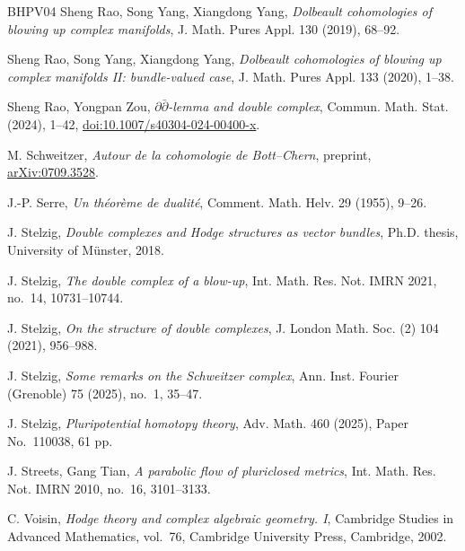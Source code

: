 \documentclass[11pt]{amsart}
\numberwithin{equation}{section}
\theoremstyle{plain}
\theoremstyle{definition}
\begin{document}
\begin{thebibliography}{BHPV04}
Sheng Rao, Song Yang, Xiangdong Yang,
\textit{Dolbeault cohomologies of blowing up complex manifolds},
J. Math. Pures Appl. 130 (2019), 68--92.

Sheng Rao, Song Yang, Xiangdong Yang,
\textit{Dolbeault cohomologies of blowing up complex manifolds II:
bundle-valued case},
J. Math. Pures Appl. 133 (2020), 1--38.

%
Sheng Rao, Yongpan Zou,
\textit{$\partial\bar\partial$-lemma and double complex},
Commun. Math. Stat. (2024), 1--42,
\href{https://doi.org/10.1007/s40304-024-00400-x}
{doi:10.1007/s40304-024-00400-x}.

%
M. Schweitzer,
\textit{Autour de la cohomologie de Bott--Chern},
preprint, \href{https://arxiv.org/abs/0709.3528}{arXiv:0709.3528}.

J.-P. Serre,
\textit{Un th\'eor\`eme de dualit\'e},
Comment. Math. Helv. 29 (1955), 9--26.

J. Stelzig,
\textit{Double complexes and Hodge structures as vector bundles},
Ph.D. thesis, University of M\"unster, 2018.

J. Stelzig,
\textit{The double complex of a blow-up},
Int. Math. Res. Not. IMRN 2021, no.~14, 10731--10744.

J. Stelzig,
\textit{On the structure of double complexes},
J. London Math. Soc. (2) 104 (2021), 956--988.

J. Stelzig,
\textit{Some remarks on the Schweitzer complex},
Ann. Inst. Fourier (Grenoble) 75 (2025), no.~1, 35--47.

J. Stelzig,
\textit{Pluripotential homotopy theory},
Adv. Math. 460 (2025), Paper No.~110038, 61 pp.

J. Streets, Gang Tian,
\textit{A parabolic flow of pluriclosed metrics},
Int. Math. Res. Not. IMRN 2010, no.~16, 3101--3133.

C. Voisin,
\textit{Hodge theory and complex algebraic geometry. I},
Cambridge Studies in Advanced Mathematics, vol.~76,
Cambridge University Press, Cambridge, 2002.


\end{thebibliography}
\end{document}
